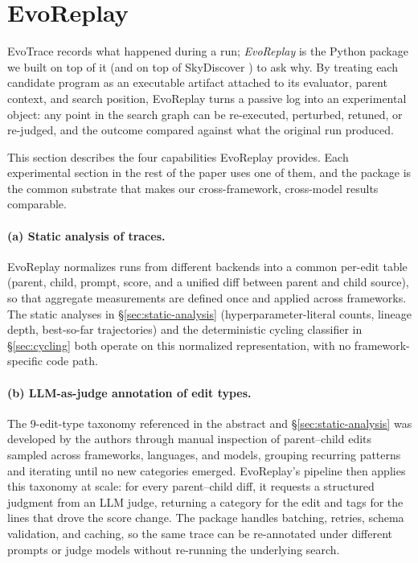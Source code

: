 \section{EvoReplay}
\label{sec:evoreplay}

EvoTrace records what happened during a run; \emph{EvoReplay} is the Python package we built on top of it (and on top of SkyDiscover \citep{skydiscover2026}) to ask why. By treating each candidate program as an executable artifact attached to its evaluator, parent context, and search position, EvoReplay turns a passive log into an experimental object: any point in the search graph can be re-executed, perturbed, retuned, or re-judged, and the outcome compared against what the original run produced.

This section describes the four capabilities EvoReplay provides. Each experimental section in the rest of the paper uses one of them, and the package is the common substrate that makes our cross-framework, cross-model results comparable.

\paragraph{(a) Static analysis of traces.}
EvoReplay normalizes runs from different backends into a common per-edit table (parent, child, prompt, score, and a unified diff between parent and child source), so that aggregate measurements are defined once and applied across frameworks. The static analyses in \S\ref{sec:static-analysis} (hyperparameter-literal counts, lineage depth, best-so-far trajectories) and the deterministic cycling classifier in \S\ref{sec:cycling} both operate on this normalized representation, with no framework-specific code path.

\paragraph{(b) LLM-as-judge annotation of edit types.}
The 9-edit-type taxonomy referenced in the abstract and \S\ref{sec:static-analysis} was developed by the authors through manual inspection of parent--child edits sampled across frameworks, languages, and models, grouping recurring patterns and iterating until no new categories emerged. EvoReplay's pipeline then applies this taxonomy at scale: for every parent--child diff, it requests a structured judgment from an LLM judge, returning a category for the edit and tags for the lines that drove the score change. The package handles batching, retries, schema validation, and caching, so the same trace can be re-annotated under different prompts or judge models without re-running the underlying search.


